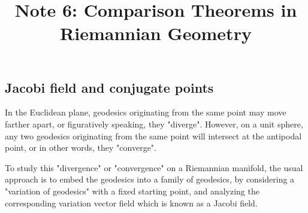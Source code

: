 \documentclass{ctexart}
\title{Note 6: Comparison Theorems in Riemannian Geometry}
\date{} %
\begin{document}
\maketitle

\subsection*{Jacobi field and conjugate points}

In the Euclidean plane, geodesics originating from the same point may move farther apart, or figuratively speaking, they "diverge". However, on a unit sphere, 
any two geodesics originating from the same point will intersect at the antipodal point, or in other words, they "converge".

To study this "divergence" or "convergence" on a Riemannian manifold, the usual approach is to embed the geodesics into a family of geodesics, 
by considering a "variation of geodesics" with a fixed starting point, and analyzing the corresponding variation vector field which is known as a Jacobi field. 
\end{document}
